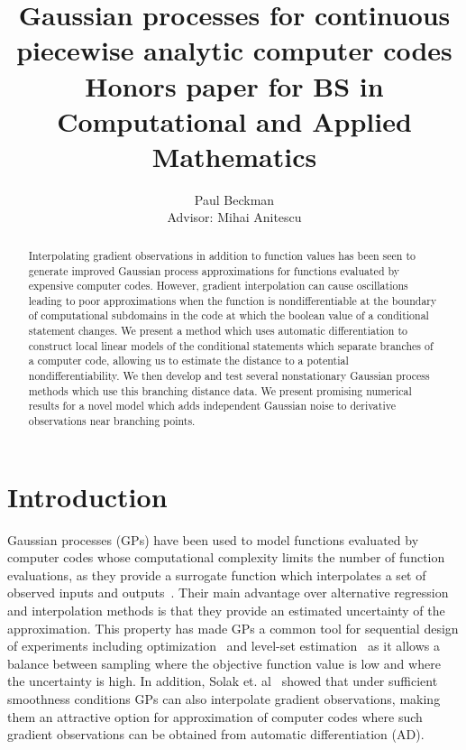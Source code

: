 \documentclass{article}
\title{\textbf{Gaussian processes for continuous piecewise analytic computer codes} \\[1.5ex] \large Honors paper for BS in Computational and Applied Mathematics}
\author{
Paul Beckman \\
Advisor: Mihai Anitescu
}
\date{}
\numberwithin{equation}{section}
\begin{document}
\maketitle
\begin{abstract}
\noindent Interpolating gradient observations in addition to function values has been seen to generate improved Gaussian process approximations for functions evaluated by expensive computer codes. However, gradient interpolation can cause oscillations leading to poor approximations when the function is nondifferentiable at the boundary of computational subdomains in the code at which the boolean value of a conditional statement changes. We present a method which uses automatic differentiation to construct local linear models of the conditional statements which separate branches of a computer code, allowing us to estimate the distance to a potential nondifferentiability. We then develop and test several nonstationary Gaussian process methods which use this branching distance data. We present promising numerical results for a novel model which adds independent Gaussian noise to derivative observations near branching points.
\end{abstract}

\section{Introduction}
Gaussian processes (GPs) have been used to model functions evaluated by computer codes whose computational complexity limits the number of function evaluations, as they provide a surrogate function which interpolates a set of observed inputs and outputs~\cite{sacks1989design}. Their main advantage over alternative regression and interpolation methods is that they provide an estimated uncertainty of the approximation. This property has made GPs a common tool for sequential design of experiments including optimization~\cite{jones1998efficient} and level-set estimation~\cite{ranjan2008sequential} as it allows a balance between sampling where the objective function value is low and where the uncertainty is high. In addition, Solak et. al~\cite{solak2003derivative} showed that under sufficient smoothness conditions GPs can also interpolate gradient observations, making them an attractive option for approximation of computer codes where such gradient observations can be obtained from automatic differentiation (AD).
\end{document}
